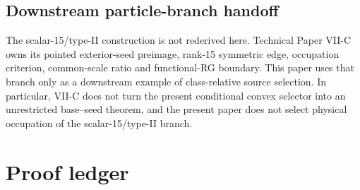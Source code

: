 \documentclass[11pt]{article}
\begin{document}
\subsection{Downstream particle-branch handoff}

The scalar-15/type-II construction is not rederived here. Technical Paper
VII-C owns its pointed exterior-seed preimage, rank-15 symmetric edge,
occupation criterion, common-scale ratio and functional-RG boundary. This
paper uses that branch only as a downstream example of class-relative source
selection. In particular, VII-C does not turn the present conditional convex
selector into an unrestricted base--seed theorem, and the present paper does
not select physical occupation of the scalar-15/type-II branch.

\section{Proof ledger}
\end{document}
